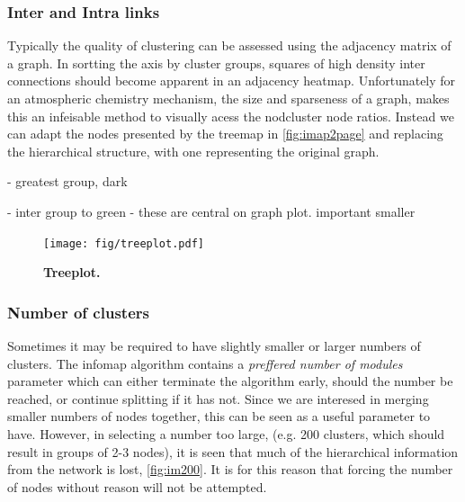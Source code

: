 
\subsubsection{Inter and Intra links}
 Typically the quality of clustering can be assessed using the adjacency matrix of a graph. In sortting the axis by cluster groups, squares of high density inter connections should become apparent in an adjacency heatmap. Unfortunately for an atmospheric chemistry mechanism, the size and sparseness of a graph, makes this an infeisable method to visually acess the nodcluster node ratios. Instead we can adapt the nodes presented by the treemap in \autoref{fig:imap2page} and replacing the hierarchical structure, with one representing the original graph.

-  greatest group, dark

- inter group to green - these are central on graph plot. important smaller


   \begin{figure}[H]
     \centering
     \texttt{[image: fig/treeplot.pdf]}
     \caption{\textbf{Treeplot.} }
         \label{fig:imtreeplot}
   \end{figure}





 \subsubsection{Number of clusters}
Sometimes it may be required to have slightly smaller or larger numbers of clusters. The infomap algorithm contains a \emph{preffered number of modules} parameter which can either terminate the algorithm early, should the number be reached, or continue splitting if it has not. Since we are interesed in merging smaller numbers of nodes together, this can be seen as a useful parameter to have. However, in selecting a number too large, (e.g. 200 clusters, which should result in groups of 2-3 nodes), it is seen that much of the hierarchical information from the network is lost, \autoref{fig:im200}. It is for this reason that forcing the number of nodes without reason will not be attempted.


